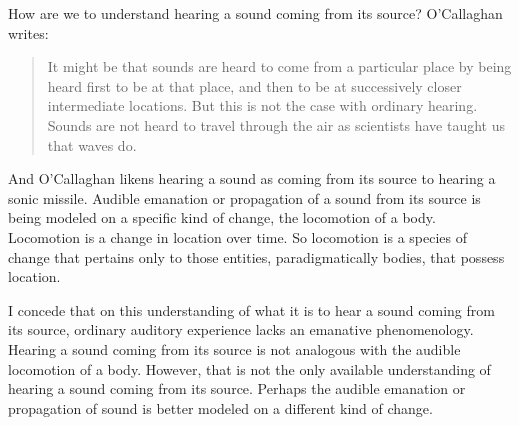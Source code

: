 How are we to understand hearing a sound coming from its source? O'Callaghan writes:
\begin{quote}
	It might be that sounds are heard to come from a particular place by being heard first to be at that place, and then to be at successively closer intermediate locations. But this is not the case with ordinary hearing. Sounds are not heard to travel through the air as scientists have taught us that waves do. \citep[34]{OCallaghan:2007xy}
\end{quote}
And O'Callaghan likens hearing a sound as coming from its source to hearing a sonic missile. Audible emanation or propagation of a sound from its source is being modeled on a specific kind of change, the locomotion of a body. Locomotion is a change in location over time. So locomotion is a species of change that pertains only to those entities, paradigmatically bodies, that possess location. 

I concede that on this understanding of what it is to hear a sound coming from its source, ordinary auditory experience lacks an emanative phenomenology. Hearing a sound coming from its source is not analogous with the audible locomotion of a body. However, that is not the only available understanding of hearing a sound coming from its source. Perhaps the audible emanation or propagation of sound is better modeled on a different kind of change. 

